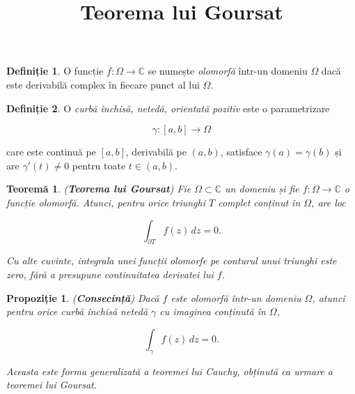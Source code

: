 \documentclass[12pt]{article}
\title{Teorema lui Goursat}
\author{}
\date{}
\theoremstyle{definition}
\newtheorem{definition}{Definiție}
\theoremstyle{plain}
\newtheorem{theorem}{Teoremă}
\newtheorem{proposition}{Propoziție}
\begin{document}
\maketitle

\begin{definition}
O funcție $f:\Omega \to \mathbb{C}$ se numește \emph{olomorfă} într-un domeniu $\Omega$ dacă este derivabilă complex în fiecare punct al lui $\Omega$.
\end{definition}

\begin{definition}
O \emph{curbă închisă, netedă, orientată pozitiv} este o parametrizare


\[
\gamma : [a,b] \to \Omega
\]


care este continuă pe $[a,b]$, derivabilă pe $(a,b)$, satisface $\gamma(a)=\gamma(b)$ și are $\gamma'(t)\neq 0$ pentru toate $t\in(a,b)$.
\end{definition}

\begin{theorem}
(\textbf{Teorema lui Goursat})  
Fie $\Omega \subset \mathbb{C}$ un domeniu și fie $f:\Omega \to \mathbb{C}$ o funcție olomorfă.  
Atunci, pentru orice triunghi $T$ complet conținut în $\Omega$, are loc


\[
\int_{\partial T} f(z)\,dz = 0.
\]


Cu alte cuvinte, integrala unei funcții olomorfe pe conturul unui triunghi este zero, \emph{fără a presupune continuitatea derivatei} lui $f$.
\end{theorem}

\begin{proposition}
(\textbf{Consecință})  
Dacă $f$ este olomorfă într-un domeniu $\Omega$, atunci pentru orice curbă închisă netedă $\gamma$ cu imaginea conținută în $\Omega$,


\[
\int_{\gamma} f(z)\,dz = 0.
\]


Aceasta este forma generalizată a teoremei lui Cauchy, obținută ca urmare a teoremei lui Goursat.
\end{proposition}
\end{document}
